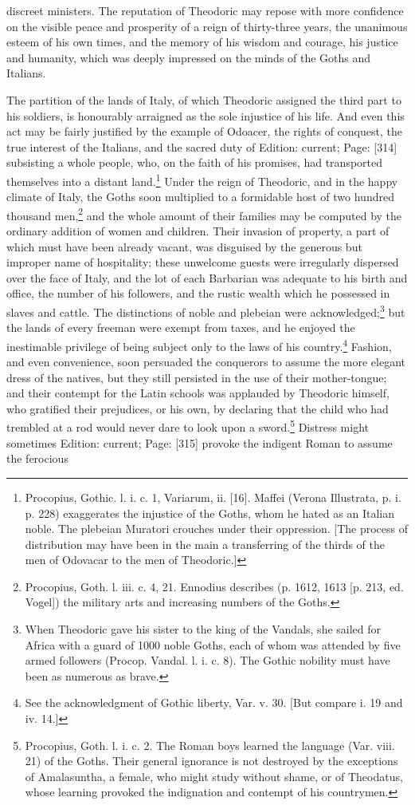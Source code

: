 discreet ministers. The reputation of Theodoric may repose with more confidence on the visible peace and prosperity of a reign of thirty-three years, the unanimous esteem of his own times, and the memory of his wisdom and courage, his justice and humanity, which was deeply impressed on the minds of the Goths and Italians.

The partition of the lands of Italy, of which Theodoric assigned the third part to his soldiers, is honourably arraigned as the sole injustice of his life. And even this act may be fairly justified by the example of Odoacer, the rights of conquest, the true interest of the Italians, and the sacred duty of Edition: current; Page: [314] subsisting a whole people, who, on the faith of his promises, had transported themselves into a distant land.\footnote{Procopius, Gothic. l. i. c. 1, Variarum, ii. [16]. Maffei (Verona Illustrata, p. i. p. 228) exaggerates the injustice of the Goths, whom he hated as an Italian noble. The plebeian Muratori crouches under their oppression. [The process of distribution may have been in the main a transferring of the thirds of the men of Odovacar to the men of Theodoric.]} Under the reign of Theodoric, and in the happy climate of Italy, the Goths soon multiplied to a formidable host of two hundred thousand men,\footnote{Procopius, Goth. l. iii. c. 4, 21. Ennodius describes (p. 1612, 1613 [p. 213, ed. Vogel]) the military arts and increasing numbers of the Goths.} and the whole amount of their families may be computed by the ordinary addition of women and children. Their invasion of property, a part of which must have been already vacant, was disguised by the generous but improper name of hospitality; these unwelcome guests were irregularly dispersed over the face of Italy, and the lot of each Barbarian was adequate to his birth and office, the number of his followers, and the rustic wealth which he possessed in slaves and cattle. The distinctions of noble and plebeian were acknowledged;\footnote{When Theodoric gave his sister to the king of the Vandals, she sailed for Africa with a guard of 1000 noble Goths, each of whom was attended by five armed followers (Procop. Vandal. l. i. c. 8). The Gothic nobility must have been as numerous as brave.} but the lands of every freeman were exempt from taxes, and he enjoyed the inestimable privilege of being subject only to the laws of his country.\footnote{See the acknowledgment of Gothic liberty, Var. v. 30. [But compare i. 19 and iv. 14.]} Fashion, and even convenience, soon persuaded the conquerors to assume the more elegant dress of the natives, but they still persisted in the use of their mother-tongue; and their contempt for the Latin schools was applauded by Theodoric himself, who gratified their prejudices, or his own, by declaring that the child who had trembled at a rod would never dare to look upon a sword.\footnote{Procopius, Goth. l. i. c. 2. The Roman boys learned the language (Var. viii. 21) of the Goths. Their general ignorance is not destroyed by the exceptions of Amalasuntha, a female, who might study without shame, or of Theodatus, whose learning provoked the indignation and contempt of his countrymen.} Distress might sometimes Edition: current; Page: [315] provoke the indigent Roman to assume the ferocious 